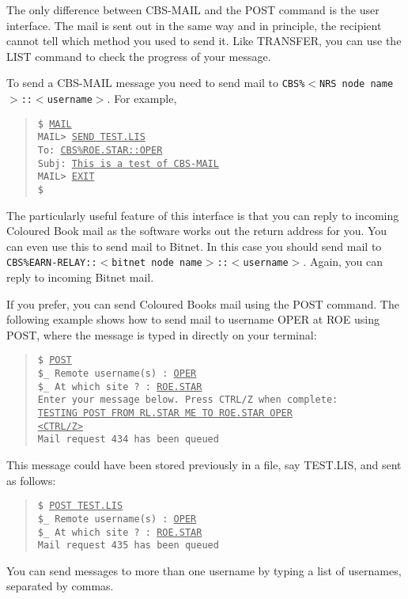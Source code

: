 The only difference between CBS-MAIL and the POST command is the user
interface. The mail is sent out in the same way and in principle, the recipient
cannot tell which method you used to send it. Like TRANSFER, you can use the
LIST command to check the progress of your message.

To send a CBS-MAIL message you need to send mail to 
{\tt CBS\%$<$NRS node name$>$::$<$username$>$}.
For example,
\begin{quote}
{\tt \$ \underline{MAIL}\\[\medskipamount]
MAIL> \underline{SEND TEST.LIS}\\
To:     \underline{CBS\%ROE.STAR::OPER}\\
Subj:   \underline{This is a test of CBS-MAIL}\\[\medskipamount]
MAIL> \underline{EXIT}\\[\medskipamount]
\$}
\end{quote}
The particularly useful feature of this interface is that you can reply to
incoming Coloured Book mail as the software works out the return address for
you. You can even use this to send mail to Bitnet. In this case you should send
mail to {\tt CBS\%EARN-RELAY::$<$bitnet node name$>$::$<$username$>$}. Again,
you can reply to incoming Bitnet mail.

If you prefer, you can send Coloured Books mail using the POST command. 
The following example shows how to send mail to username OPER at ROE using POST,
where the message is typed in directly on your terminal:
\begin{quote}
{\tt \$ \underline{POST}\\
\$\_ Remote username(s) : \underline{OPER}\\
\$\_ At which site ?    : \underline{ROE.STAR}\\
Enter your message below. Press CTRL/Z when complete:\\
\underline{TESTING POST FROM RL.STAR ME TO ROE.STAR OPER}\\
\underline{<CTRL/Z>}\\
Mail request 434 has been queued}
\end{quote}
This message could have been stored previously in a file, say TEST.LIS, and sent
as follows:
\begin{quote}
{\tt \$ \underline{POST TEST.LIS}\\
\$\_ Remote username(s) : \underline{OPER}\\
\$\_ At which site ?    : \underline{ROE.STAR}\\
Mail request 435 has been queued}
\end{quote}
You can send messages to more than one username by typing a list of usernames,
separated by commas.

